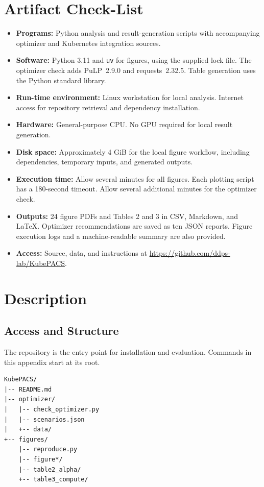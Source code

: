 \documentclass[sigconf,9pt,nonacm,balance=false]{acmart}
\newcommand{\repo}{https://github.com/ddps-lab/KubePACS}
\begin{document}
\section{Artifact Check-List}
\begin{itemize}
  \item \textbf{Programs:} Python analysis and result-generation scripts with
    accompanying optimizer and Kubernetes integration sources.
  \item \textbf{Software:} Python 3.11 and \texttt{uv} for figures, using the
    supplied lock file. The optimizer check adds PuLP~2.9.0 and
    requests~2.32.5. Table generation uses the Python standard library.
  \item \textbf{Run-time environment:} Linux workstation for local analysis.
    Internet access for repository retrieval and dependency installation.
  \item \textbf{Hardware:} General-purpose CPU. No GPU required for local
    result generation.
  \item \textbf{Disk space:} Approximately 4 GiB for the local figure workflow,
    including dependencies, temporary inputs, and generated outputs.
  \item \textbf{Execution time:} Allow several minutes for all figures.
    Each plotting script has a 180-second timeout. Allow several additional
    minutes for the optimizer check.
  \item \textbf{Outputs:} 24 figure PDFs and Tables 2 and 3 in CSV, Markdown,
    and LaTeX. Optimizer recommendations are saved as ten JSON reports.
    Figure execution logs and a machine-readable summary are also provided.
  \item \textbf{Access:} Source, data, and instructions at \url{\repo}.
\end{itemize}

\section{Description}
\subsection{Access and Structure}
The repository is the entry point for installation and evaluation. Commands
in this appendix start at its root.
\begin{lstlisting}
KubePACS/
|-- README.md
|-- optimizer/
|   |-- check_optimizer.py
|   |-- scenarios.json
|   +-- data/
+-- figures/
    |-- reproduce.py
    |-- figure*/
    |-- table2_alpha/
    +-- table3_compute/
\end{lstlisting}
\end{document}
